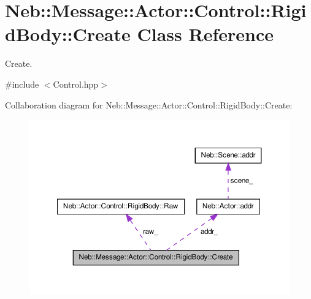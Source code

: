 \hypertarget{classNeb_1_1Message_1_1Actor_1_1Control_1_1RigidBody_1_1Create}{\section{\-Neb\-:\-:\-Message\-:\-:\-Actor\-:\-:\-Control\-:\-:\-Rigid\-Body\-:\-:\-Create \-Class \-Reference}
\label{classNeb_1_1Message_1_1Actor_1_1Control_1_1RigidBody_1_1Create}
}


\-Create.  




{\ttfamily \#include $<$\-Control.\-hpp$>$}



\-Collaboration diagram for \-Neb\-:\-:\-Message\-:\-:\-Actor\-:\-:\-Control\-:\-:\-Rigid\-Body\-:\-:\-Create\-:\nopagebreak
\begin{figure}[H]
\begin{center}
\leavevmode
\includegraphics[width=350pt]{classNeb_1_1Message_1_1Actor_1_1Control_1_1RigidBody_1_1Create__coll__graph}
\end{center}
\end{figure}
